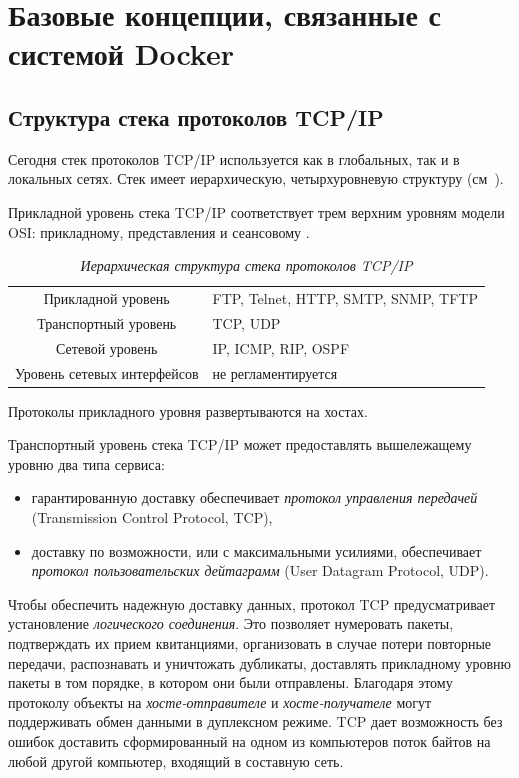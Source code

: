 \documentclass[%
	11pt,
	a4paper,
	utf8,
		]{article}
\begin{document}
\section{Базовые концепции, связанные с системой Docker}

\subsection{Структура стека протоколов TCP/IP}

Сегодня стек протоколов TCP/IP используется как в глобальных, так и в локальных сетях. Стек имеет иерархическую, четырхуровневую структуру (см~).

Прикладной уровень стека TCP/IP соответствует трем верхним уровням модели OSI: прикладному, представления и сеансовому \cite{olifer:compnets-2020}.

\begin{table}[h]
	\centering
	\caption{\itshape Иерархическая структура стека протоколов TCP/IP}\label{tab:tcpip}
	\begin{tabular}{cl}
		\rowcolor[gray]{0.96} {Прикладной уровень} & FTP, Telnet, HTTP, SMTP, SNMP, TFTP \\
		Транспортный уровень & TCP, UDP \\
		\rowcolor[gray]{0.96} {Сетевой уровень} & IP, ICMP, RIP, OSPF \\
		Уровень сетевых интерфейсов & не регламентируется
	\end{tabular}
\end{table}

Протоколы прикладного уровня развертываются на хостах.

Транспортный уровень стека TCP/IP может предоставлять вышележащему уровню два типа сервиса:

\begin{itemize}
	\item гарантированную доставку обеспечивает \emph{протокол управления передачей} (Transmission Control Protocol, TCP),
	
	\item доставку по возможности, или с максимальными усилиями, обеспечивает \emph{протокол пользовательских дейтаграмм} (User Datagram Protocol, UDP).
\end{itemize}

Чтобы обеспечить надежную доставку данных, протокол TCP предусматривает установление \emph{логического соединения}. Это позволяет нумеровать пакеты, подтверждать их прием квитанциями, организовать в случае потери повторные передачи, распознавать и уничтожать дубликаты, доставлять прикладному уровню пакеты в том порядке, в котором они были отправлены. Благодаря этому протоколу объекты на \emph{хосте-отправителе} и \emph{хосте-получателе} могут поддерживать обмен данными в дуплексном режиме. TCP дает возможность без ошибок доставить сформированный на одном из компьютеров поток байтов на любой другой компьютер, входящий в составную сеть.
\end{document}
